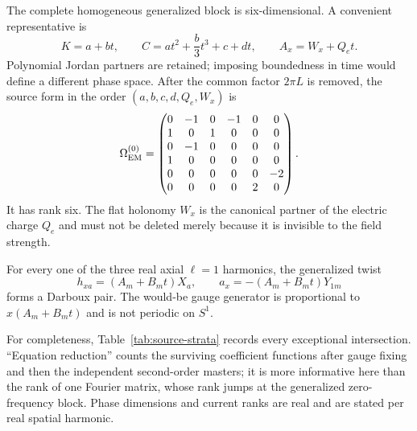 \documentclass[11pt]{article}
\theoremstyle{remark}
\begin{document}
The complete homogeneous generalized block is six-dimensional. A convenient
representative is
\begin{equation}\label{eq:hom-rep}
 K=a+bt,\qquad C=at^2+\frac b3t^3+c+dt,\qquad A_x=W_x+Q_et.
\end{equation}
Polynomial Jordan partners are retained; imposing boundedness in time would
define a different phase space. After the common factor $2\pi L$ is removed,
the source form in the order $(a,b,c,d,Q_e,W_x)$ is
\begin{equation}\label{eq:hom-source}
 \Omega_{\rm EM}^{(0)}=
 \begin{pmatrix}
 0&-1&0&-1&0&0\\ 1&0&1&0&0&0\\
 0&-1&0&0&0&0\\ 1&0&0&0&0&0\\
 0&0&0&0&0&-2\\ 0&0&0&0&2&0
 \end{pmatrix}.
\end{equation}
It has rank six. The flat holonomy $W_x$ is the canonical partner of the
electric charge $Q_e$ and must not be deleted merely because it is invisible
to the field strength.

For every one of the three real axial $\ell=1$ harmonics, the generalized
twist
\begin{equation}\label{eq:twist-rep}
 h_{xa}=(A_m+B_mt)X_a,\qquad a_x=-(A_m+B_mt)Y_{1m}
\end{equation}
forms a Darboux pair. The would-be gauge generator is proportional to
$x(A_m+B_mt)$ and is not periodic on $S^1$.

For completeness, Table~\ref{tab:source-strata} records every exceptional
intersection. ``Equation reduction'' counts the surviving coefficient
functions after gauge fixing and then the independent second-order masters;
it is more informative here than the rank of one Fourier matrix, whose rank
jumps at the generalized zero-frequency block. Phase dimensions and current
ranks are real and are stated per real spatial harmonic.
\end{document}
